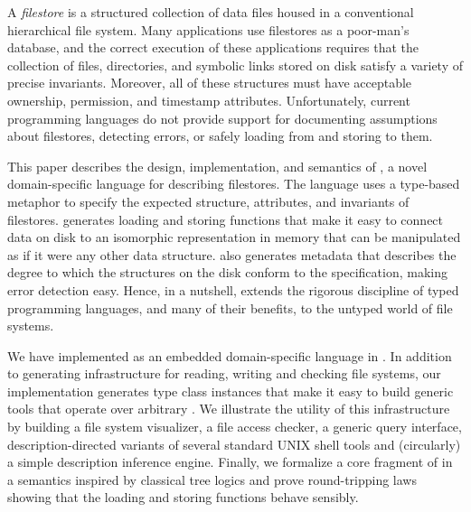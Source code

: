 A {\em filestore} is a structured collection of data files housed in a
conventional hierarchical file system. Many applications use filestores
as a poor-man's database, and the correct execution of these
applications requires that the collection of files, directories, and
symbolic links stored on disk satisfy a variety of precise
invariants. Moreover, all of these structures must have acceptable
ownership, permission, and timestamp attributes. Unfortunately,
current programming languages do not provide support for documenting
assumptions about filestores, detecting errors, or safely loading from
and storing to them.

This paper describes the design, implementation, and semantics of
\forest{}, a novel domain-specific language for describing
filestores. The language uses a type-based metaphor to specify the
expected structure, attributes, and invariants of filestores.
\forest{} generates loading and storing functions that make it easy to
connect data on disk to an isomorphic representation in memory that
can be manipulated as if it were any other data structure.  \forest{}
also generates metadata that describes the degree to which the
structures on the disk conform to the specification, making error
detection easy. Hence, in a nutshell, \forest{} extends the
rigorous discipline of typed 
programming languages, and many of their benefits, to the untyped 
world of file systems.

We have implemented \forest{} as an embedded domain-specific language
in \haskell{}. In addition to generating infrastructure for reading,
writing and checking file systems, our implementation generates 
type class instances that make it easy to build generic tools that
operate over arbitrary \filestores.  We illustrate the utility of
this infrastructure by building a file system visualizer, a file access
checker, a generic query interface, description-directed variants of 
several standard UNIX shell tools and (circularly) a simple \forest{}
description inference engine.   Finally, we formalize a core fragment 
of \forest{} in a
semantics inspired by classical tree logics and prove round-tripping
laws showing that the loading and storing functions behave sensibly.
